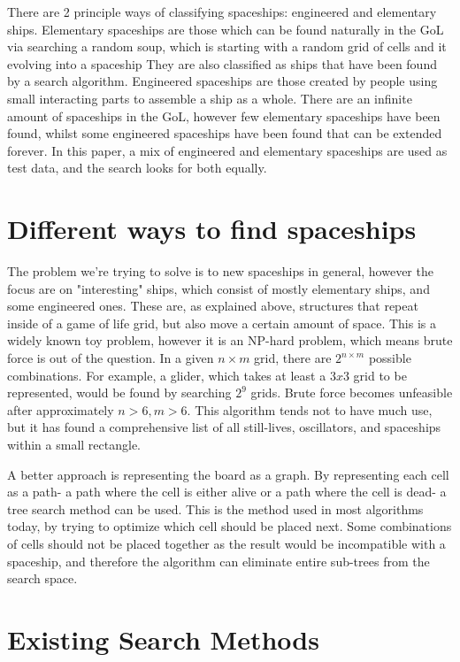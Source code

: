 \documentclass{l4proj}
\begin{document}
There are 2 principle ways of classifying spaceships: engineered and elementary ships. Elementary spaceships are those which can be found naturally in the GoL via searching a random soup, which is starting with a random grid of cells and it evolving into a spaceship They are also classified as ships that have been found by a search algorithm. Engineered spaceships are those created by people using small interacting parts to assemble a ship as a whole. There are an infinite amount of spaceships in the GoL, however few elementary spaceships have been found, whilst some engineered spaceships have been found that can be extended forever. In this paper, a mix of engineered and elementary spaceships are used as test data, and the search looks for both equally.


\section{Different ways to find spaceships}

The problem we're trying to solve is to new spaceships in general, however the focus are on "interesting" ships, which consist of mostly elementary ships, and some engineered ones. These are, as explained above, structures that repeat inside of a game of life grid, but also move a certain amount of space. This is a widely known toy problem, however it is an NP-hard problem, which means brute force is out of the question. In a given $n \times m$ grid, there are $2^{n \times m}$ possible combinations. For example, a glider, which takes at least a $3x3$ grid to be represented, would be found by searching $2^{9}$ grids. Brute force becomes unfeasible after approximately $n > 6, m > 6$. This algorithm tends not to have much use, but it has found a comprehensive list of all still-lives, oscillators, and spaceships within a small rectangle.

A better approach is representing the board as a graph. By representing each cell as a path- a path where the cell is either alive or a path where the cell is dead- a tree search method can be used. This is the method used in most algorithms today, by trying to optimize which cell should be placed next. Some combinations of cells should not be placed together as the result would be incompatible with a spaceship, and therefore the algorithm can eliminate entire sub-trees from the search space.

\section{Existing Search Methods}
\end{document}

